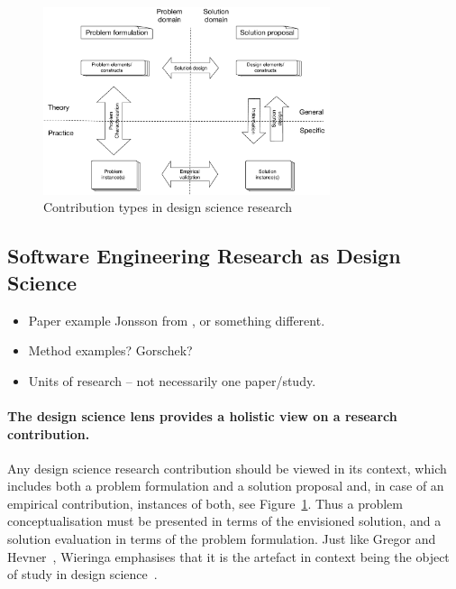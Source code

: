 \documentclass[graybox]{svmult}
\begin{document}
\begin{figure}
  \includegraphics[width=0.75\textwidth]{Figures/DS_model.pdf}
\caption{Contribution types in design science research}
\label{fig:contributiontypes}       %
\end{figure}



\subsection{Software Engineering Research as Design Science}
\begin{itemize}
\item Paper example Jonsson \cite{JonssonBug15} from \cite{StoreyESEM17}, or something different.
\item Method examples? Gorschek? \cite{GorschekSW2006}
\item Units of research -- not necessarily one paper/study.
\end{itemize}

\paragraph{The design science lens provides a holistic view on a research contribution.} 

Any design science research contribution should be viewed in its context, which includes both a problem formulation and a solution proposal and, in case of an empirical contribution, instances of both, see Figure~\ref{fig:contributiontypes}. Thus a problem conceptualisation must be presented in terms of the envisioned solution, and a solution evaluation in terms of the problem formulation. 
Just like Gregor and Hevner~\cite{gregor_positioning_2013}, Wieringa emphasises that it is the artefact in context being the object of study in design science~\cite{wieringa_design_2009}.
\end{document}
